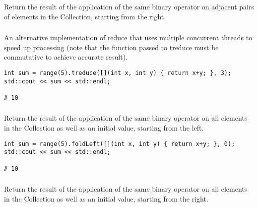 Return the result of the application of the same binary operator on adjacent pairs of elements in the Collection, starting from the right.





\subsubsection{}

An alternative implementation of reduce that uses multiple concurrent threads to speed up processing
(note that the function passed to treduce must be commutative to achieve accurate result).

\begin{lstlisting}[title=example]
int sum = range(5).treduce([](int x, int y) { return x+y; }, 3);
std::cout << sum << std::endl;

# 10
\end{lstlisting}




\subsubsection{}

Return the result of the application of the same binary operator on all elements in the Collection as well as an initial value, starting from the left.

\begin{lstlisting}[title=example]
int sum = range(5).foldLeft([](int x, int y) { return x+y; }, 0);
std::cout << sum << std::endl;

# 10
\end{lstlisting}




\subsubsection{}

Return the result of the application of the same binary operator on all elements in the Collection as well as an initial value, starting from the right.




\subsubsection{}

